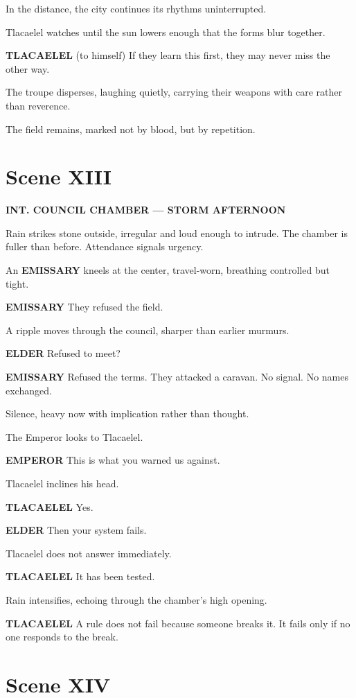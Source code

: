 \documentclass[12pt]{article}
\begin{document}
In the distance, the city continues its rhythms uninterrupted.

Tlacaelel watches until the sun lowers enough that the forms blur together.

\textbf{TLACAELEL}  
(to himself)  
If they learn this first, they may never miss the other way.

The troupe disperses, laughing quietly, carrying their weapons with care rather than reverence.

The field remains, marked not by blood, but by repetition.

\section*{Scene XIII}

\textbf{INT. COUNCIL CHAMBER --- STORM AFTERNOON}

Rain strikes stone outside, irregular and loud enough to intrude. The chamber is fuller than before. Attendance signals urgency.

An \textbf{EMISSARY} kneels at the center, travel-worn, breathing controlled but tight.

\textbf{EMISSARY}  
They refused the field.

A ripple moves through the council, sharper than earlier murmurs.

\textbf{ELDER}  
Refused to meet?

\textbf{EMISSARY}  
Refused the terms. They attacked a caravan. No signal. No names exchanged.

Silence, heavy now with implication rather than thought.

The Emperor looks to Tlacaelel.

\textbf{EMPEROR}  
This is what you warned us against.

Tlacaelel inclines his head.

\textbf{TLACAELEL}  
Yes.

\textbf{ELDER}  
Then your system fails.

Tlacaelel does not answer immediately.

\textbf{TLACAELEL}  
It has been tested.

Rain intensifies, echoing through the chamber’s high opening.

\textbf{TLACAELEL}  
A rule does not fail because someone breaks it.  
It fails only if no one responds to the break.

\section*{Scene XIV}
\end{document}
